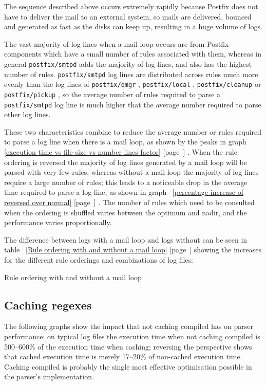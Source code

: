 \documentclass[a4paper,12pt,draft]{article}
\newcommand{\showtable}[3]{
    \begin{table}[ht]
        \caption{#2}\label{#3}
        
    \end{table}
}
\newcommand{\refwithpage}[1]{%
    \empty{}\ref{#1} [page~\pageref{#1}]%
}
\newcommand{\daemon}[1]{%
    \texttt{postfix/#1}%
}
\begin{document}
The sequence described above occurs extremely rapidly because Postfix does
not have to deliver the mail to an external system, so mails are delivered,
bounced and generated as fast as the disks can keep up, resulting in a huge
volume of logs.

The vast majority of log lines when a mail loop occurs are from Postfix
components which have a small number of rules associated with them, whereas
in general \daemon{smtpd} adds the majority of log lines, and also has the
highest number of rules.  \daemon{smtpd} log lines are distributed across
rules much more evenly than the log lines of \daemon{qmgr}, \daemon{local},
\daemon{cleanup} or \daemon{pickup}, so the average number of rules
required to parse a \daemon{smtpd} log line is much higher that the average
number required to parse other log lines.

These two characteristics combine to reduce the average number or rules
required to parse a log line when there is a mail loop, as shown by the
peaks in graph~\refwithpage{execution time vs file size vs number lines
factor}.  When the rule ordering is reversed the majority of log lines
generated by a mail loop will be parsed with very few rules, whereas
without a mail loop the majority of log lines require a large number of
rules; this leads to a noticeable drop in the average time required to
parse a log line, as shown in graph~\refwithpage{percentage increase of
reversed over normal}.  The number of rules which need to be consulted when
the ordering is shuffled varies between the optimum and nadir, and the
performance varies proportionally.

The difference between logs with a mail loop and logs without can be seen
in table~\refwithpage{Rule ordering with and without a mail loop} showing
the increases for the different rule orderings and combinations of log
files:

\showtable{build/stats-normal-shuffle-reverse-include}{Rule ordering with
and without a mail loop}{Rule ordering with and without a mail loop}



\subsection{Caching regexes}

The following graphs show the impact that not caching compiled \regexes{}
has on parser performance: on typical log files the execution time when not
caching compiled \regexes{} is 500--600\% of the execution time when
caching; reversing the perspective shows that cached execution time is
merely 17--20\% of non-cached execution time.  Caching compiled \regexes{}
is probably the single most effective optimisation possible in the parser's
implementation.
\end{document}
